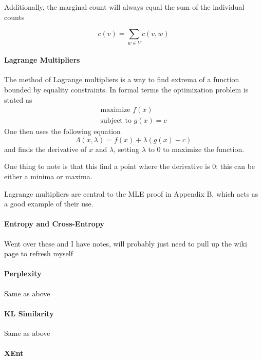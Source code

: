 \documentclass[11pt]{article}
\begin{document}
Additionally, the marginal count will always equal the sum of the individual counts

$$ c\left(v\right) = \sum\limits_{w \in V} c\left(v, w\right) $$

\paragraph{Lagrange Multipliers}

The method of Lagrange multipliers is a way to find extrema of a function bounded by equality constraints. In formal terms the optimization problem is stated as
\begin{gather*}
\text{maximize } f\left(x\right) \\
\text{subject to } g\left(x\right) = c
\end{gather*}
One then uses the following equation
$$ \Lambda\left(x, \lambda \right) = f\left(x\right) + \lambda\left(g\left(x\right) - c \right) $$
and finds the derivative of $x$ and $\lambda$, setting $\lambda$ to 0 to maximize the function.

One thing to note is that this find a point where the derivative is 0; this can be either a minima or maxima. 

Lagrange multipliers are central to the MLE proof in Appendix B, which acts as a good example of their use.

\paragraph{Entropy and Cross-Entropy}

{\color{red} Went over these and I have notes, will probably just need to pull up the wiki page to refresh myself}

\paragraph{Perplexity}

{\color{red} Same as above}

\paragraph{KL Similarity}

{\color{red} Same as above}

\paragraph{XEnt}
\end{document}
